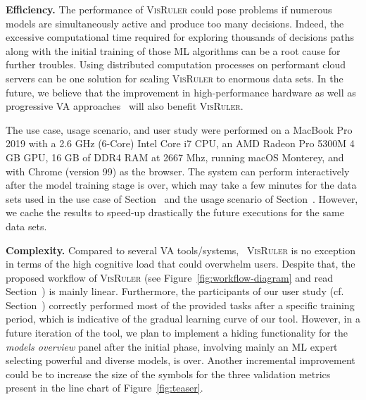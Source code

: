 \textbf{Efficiency.} The performance of \textsc{VisRuler} could pose problems if numerous models are simultaneously active and produce too many decisions. Indeed, the excessive computational time required for exploring thousands of decisions paths along with the initial training of those ML algorithms can be a root cause for further troubles. Using distributed computation processes on performant cloud servers can be one solution for scaling \textsc{VisRuler} to enormous data sets. In the future, we believe that the improvement in high-performance hardware as well as progressive VA approaches~\cite{Stolper2014Progressive,Turkay2018Progressive} will also benefit \textsc{VisRuler}.

The use case, usage scenario, and user study were performed on a MacBook Pro 2019 with a 2.6 GHz (6-Core) Intel Core i7 CPU, an AMD Radeon Pro 5300M 4 GB GPU, 16 GB of DDR4 RAM at 2667 Mhz, running macOS Monterey, and with Chrome (version 99) as the browser. The system can perform interactively after the model training stage is over, which may take a few minutes for the data sets used in the use case of Section~ and the usage scenario of Section~. However, we cache the results to speed-up drastically the future executions for the same data sets.

\textbf{Complexity.} Compared to several VA tools/systems,~\cite{Chatzimparmpas2020The} \textsc{VisRuler} is no exception in terms of the high cognitive load that could overwhelm users. Despite that, the proposed workflow of \textsc{VisRuler} (see Figure~\ref{fig:workflow-diagram} and read Section~) is mainly linear. Furthermore, the participants of our user study (cf. Section~) correctly performed most of the provided tasks after a specific training period, which is indicative of the gradual learning curve of our tool. However, in a future iteration of the tool, we plan to implement a hiding functionality for the \emph{models overview} panel after the initial phase, involving mainly an ML expert selecting powerful and diverse models, is over. Another incremental improvement could be to increase the size of the symbols for the three validation metrics present in the line chart of Figure~\ref{fig:teaser}.

